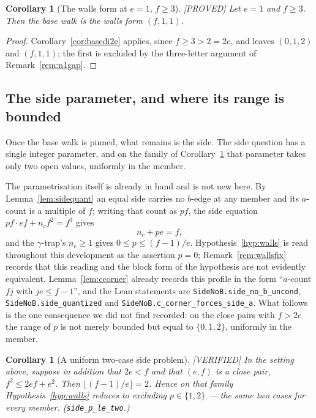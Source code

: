 \documentclass[11pt,reqno]{amsart}
\theoremstyle{plain}
\newtheorem{corollary}[theorem]{Corollary}
\theoremstyle{definition}
\newcommand{\lab}[1]{\hfill\textnormal{\footnotesize\textsc{[#1]}}}
\begin{document}
\begin{corollary}[The walls form at $e=1$, $f\ge3$]\label{cor:wallsf2e}\lab{PROVED}
Let $e=1$ and $f\ge3$. Then the base walk is the walls form $(f,1,1)$.
\end{corollary}

\begin{proof}
Corollary~\ref{cor:basedi2e} applies, since $f\ge3>2=2e$, and leaves $(0,1,2)$ and $(f,1,1)$; the
first is excluded by the three-letter argument of Remark~\ref{rem:n1gap}.
\end{proof}

\subsection{The side parameter, and where its range is bounded}\label{sub:sidep}

Once the base walk is pinned, what remains is the side. The side question has a single integer
parameter, and on the family of Corollary~\ref{cor:wallsf2e} that parameter takes only two open
values, uniformly in the member.

The parametrisation itself is already in hand and is not new here. By
Lemma~\ref{lem:sidequant} an equal side carries no $b$-edge at any member and its $a$-count is a
multiple of $f$; writing that count as $pf$, the side equation $pf\cdot ef+n_cf^2=f^3$ gives
\[
n_c+pe=f ,
\]
and the $\gamma$-trap's $n_c\ge1$ gives $0\le p\le(f-1)/e$. Hypothesis~\ref{hyp:walls} is read throughout this
development as the assertion $p=0$; Remark~\ref{rem:wallsfix} records that this reading and the
block form of the hypothesis are not evidently equivalent. Lemma~\ref{lem:ccorner} already records this profile in the form ``$a$-count
$fj$ with $je\le f-1$'', and the Lean statements are
\texttt{SideNoB.side\_no\_b\_uncond}, \texttt{SideNoB.side\_quantized} and
\texttt{SideNoB.c\_corner\_forces\_side\_a}. What follows is the one consequence we did not find
recorded: on the close pairs with $f>2e$ the range of $p$ is not merely bounded but equal to
$\{0,1,2\}$, uniformly in the member.

\begin{corollary}[A uniform two-case side problem]\label{cor:ptwo}\lab{VERIFIED}
In the setting above, suppose in addition that $2e<f$ and that $(e,f)$ is a close pair,
$f^2\le2ef+e^2$. Then
$\lfloor(f-1)/e\rfloor=2$. Hence on that family Hypothesis~\ref{hyp:walls} reduces to excluding
$p\in\{1,2\}$ --- the same two cases for every member.
\textup{(\texttt{side\_p\_le\_two}.)}
\end{corollary}
\end{document}
